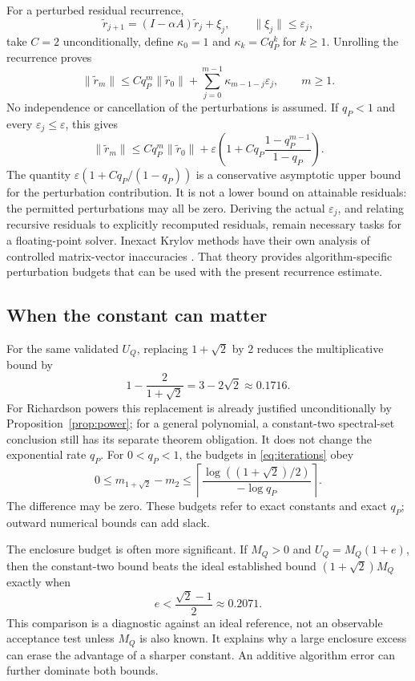 \documentclass[11pt]{article}
\newcommand{\norm}[1]{\lVert #1\rVert}
\newcommand{\cbase}{1+\sqrt{2}}
\theoremstyle{definition}
\theoremstyle{remark}
\numberwithin{equation}{section}
\begin{document}
For a perturbed residual recurrence,
\[
 \widetilde r_{j+1}=(I-\alpha A)\widetilde r_j+\xi_j,\qquad
 \norm{\xi_j}\le\varepsilon_j,
\]
take \(C=2\) unconditionally, define \(\kappa_0=1\) and
\(\kappa_k=Cq_P^k\) for \(k\ge1\).
Unrolling the recurrence proves
\begin{equation}\label{eq:roundoffrecurrence}
 \norm{\widetilde r_m}
 \le Cq_P^m\norm{\widetilde r_0}
    +\sum_{j=0}^{m-1}\kappa_{m-1-j}\varepsilon_j,
 \qquad m\ge1.
\end{equation}
No independence or cancellation of the perturbations is assumed.
If \(q_P<1\) and every \(\varepsilon_j\le\varepsilon\), this gives
\[
 \norm{\widetilde r_m}
 \le Cq_P^m\norm{\widetilde r_0}
 +\varepsilon\left(
 1+Cq_P\frac{1-q_P^{m-1}}{1-q_P}\right).
\]
The quantity \(\varepsilon(1+Cq_P/(1-q_P))\) is a conservative
asymptotic upper bound for the perturbation contribution. It is not a
lower bound on attainable residuals: the permitted perturbations may
all be zero.
Deriving the actual \(\varepsilon_j\), and relating recursive residuals
to explicitly recomputed residuals, remain necessary tasks for a
floating-point solver.
Inexact Krylov methods have their own analysis of controlled
matrix-vector inaccuracies \citep{SimonciniSzyld2003}.
That theory provides algorithm-specific perturbation budgets that can
be used with the present recurrence estimate.


\subsection{When the constant can matter}
For the same validated \(U_Q\), replacing \(\cbase\) by \(2\) reduces
the multiplicative bound by
\[
 1-\frac{2}{1+\sqrt2}=3-2\sqrt2\approx0.1716.
\]
For Richardson powers this replacement is already justified
unconditionally by Proposition~\ref{prop:power}; for a general
polynomial, a constant-two spectral-set conclusion still has its
separate theorem obligation. It does not change the exponential rate
\(q_P\).
For \(0<q_P<1\), the budgets in \eqref{eq:iterations} obey
\[
 0\le m_{\cbase}-m_2
 \le\left\lceil
 \frac{\log((1+\sqrt2)/2)}{-\log q_P}\right\rceil.
\]
The difference may be zero.
These budgets refer to exact constants and exact \(q_P\);
outward numerical bounds can add slack.

The enclosure budget is often more significant.
If \(M_Q>0\) and \(U_Q=M_Q(1+e)\), then the constant-two bound beats
the ideal established bound \((\cbase)M_Q\) exactly when
\[
 e<\frac{\sqrt2-1}{2}\approx0.2071.
\]
This comparison is a diagnostic against an ideal reference, not an
observable acceptance test unless \(M_Q\) is also known.
It explains why a large enclosure excess can erase the advantage of a
sharper constant.
An additive algorithm error can further dominate both bounds.
\end{document}
